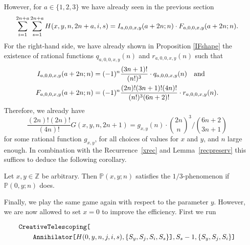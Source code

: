 \documentclass{amsart}
\numberwithin{equation}{section}
\newcommand*{\Z}{\mathbb{Z}}
\begin{document}
However, for $a\in\{1,2,3\}$ we have already seen in the previous section
\begin{align}
    \sum_{i=1}^{2n+a}\sum_{s=1}^{2n+a} H(x,y,n,{2n+a},i,s)=I_{a,0,0,x,y}(a+2n;n)\cdot F_{a,0,0,x,y}(a+2n;n).\notag
\end{align}
For the right-hand side, we have already shown in Proposition \ref{IFshape} the existence of rational functions $q_{a,0,0,x,y}(n)$ and $r_{a,0,0,x,y}(n)$ such that
\begin{align}
    I_{a,0,0,x,y}(a+2n;n)&=(-1)^n\frac{(3n+1)!}{(n!)^3}\cdot q_{a,0,0,x,y}(n) \ \ \text{ and }\notag \\
    F_{a,0,0,x,y}(a+2n;n)&=(-1)^n\frac{(2n)!(3n+1)!(4n)!}{(n!)^3(6n+2)!}\cdot r_{a,0,0,x,y}(n).\notag
\end{align}
Therefore, we already have 
\[\frac{(2n)!(2n)!}{(4n)!}G(x,y,n,2n+1)=g_{x,y}(n)\cdot \binom{2n}{n}^3\bigg/\binom{6n+2}{3n+1}\]
for some rational function $g_{x,y}$, for all choices of values for $x$ and $y$, and $n$ large enough. In combination with the Recurrence~\eqref{xrec} and Lemma~\ref{recpreserv} this suffices to deduce the following corollary.
\begin{cor}
    Let $x,y\in \Z$ be arbitrary. Then $\mathbb{P}(x,y;n)$ satisfies the $1/3$-phenomenon if $\mathbb{P}(0,y;n)$ does. 
\end{cor}

Finally, we play the same game again with respect to the parameter $y$. However, we are now allowed to set $x=0$ to improve the efficiency. First we run

\begin{align}
    \texttt{Crea}&\texttt{tiveTelescoping[}\notag\\
    &\texttt{Annihilator[}H(0,y,n,j,i,s),\{S_y,S_j,S_i,S_s\}\texttt{]},S_s-1,\{S_y,S_j,S_i\}\texttt{]}\notag
\end{align}
\end{document}
